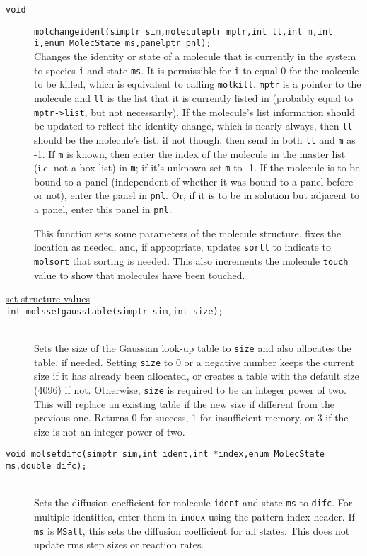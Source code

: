 \documentclass {book}
\begin{document}
\begin{description}
\item[\texttt{void}]
\texttt{molchangeident(simptr sim,moleculeptr mptr,int ll,int m,int i,enum MolecState ms,panelptr pnl);} \\
Changes the identity or state of a molecule that is currently in the system to species \texttt{i} and state \texttt{ms}. It is permissible for \texttt{i} to equal 0 for the molecule to be killed, which is equivalent to calling \texttt{molkill}. \texttt{mptr} is a pointer to the molecule and \texttt{ll} is the list that it is currently listed in (probably equal to \texttt{mptr->list}, but not necessarily). If the molecule's list information should be updated to reflect the identity change, which is nearly always, then \texttt{ll} should be the molecule's list; if not though, then send in both \texttt{ll} and \texttt{m} as -1. If \texttt{m} is known, then enter the index of the molecule in the master list (i.e. not a box list) in \texttt{m}; if it's unknown set \texttt{m} to -1. If the molecule is to be bound to a panel (independent of whether it was bound to a panel before or not), enter the panel in \texttt{pnl}. Or, if it is to be in solution but adjacent to a panel, enter this panel in \texttt{pnl}.

This function sets some parameters of the molecule structure, fixes the location as needed, and, if appropriate, updates \texttt{sortl} to indicate to \texttt{molsort} that sorting is needed. This also increments the molecule \texttt{touch} value to show that molecules have been touched.

\item[\underline{set structure values}]

\item[\texttt{int molssetgausstable(simptr sim,int size);}]
\hfill \\
Sets the size of the Gaussian look-up table to \texttt{size} and also allocates the table, if needed. Setting \texttt{size} to 0 or a negative number keeps the current size if it has already been allocated, or creates a table with the default size (4096) if not. Otherwise, \texttt{size} is required to be an integer power of two. This will replace an existing table if the new size if different from the previous one. Returns 0 for success, 1 for insufficient memory, or 3 if the size is not an integer power of two.

\item[\texttt{void molsetdifc(simptr sim,int ident,int *index,enum MolecState ms,double difc);}]
\hfill \\
Sets the diffusion coefficient for molecule \texttt{ident} and state \texttt{ms} to \texttt{difc}. For multiple identities, enter them in \texttt{index} using the pattern index header. If \texttt{ms} is \texttt{MSall}, this sets the diffusion coefficient for all states. This does not update rms step sizes or reaction rates.


\end{description}
\end{document}
